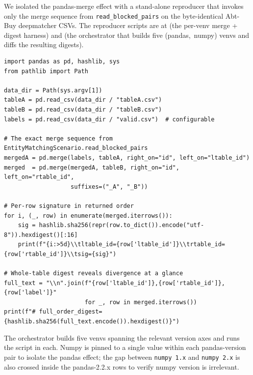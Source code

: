 \documentclass[11pt]{article}
\begin{document}
We isolated the pandas-merge effect with a stand-alone reproducer that
  invokes only the merge sequence from
  \texttt{read\_blocked\_pairs} on the byte-identical Abt-Buy
  deepmatcher CSVs.
The reproducer scripts are at
   (the per-venv merge +
  digest harness) and
   (the orchestrator that builds
  five \mbox{(pandas, numpy)} venvs and diffs the resulting digests).

\begin{lstlisting}[style=python, caption={The merge sequence under test
  (\texttt{em\_pandas\_mwe\_run.py}, excerpt).\label{lst:tr-em-mwe-run}}]
import pandas as pd, hashlib, sys
from pathlib import Path

data_dir = Path(sys.argv[1])
tableA = pd.read_csv(data_dir / "tableA.csv")
tableB = pd.read_csv(data_dir / "tableB.csv")
labels = pd.read_csv(data_dir / "valid.csv")  # configurable

# The exact merge sequence from EntityMatchingScenario.read_blocked_pairs
mergedA = pd.merge(labels, tableA, right_on="id", left_on="ltable_id")
merged  = pd.merge(mergedA, tableB, right_on="id", left_on="rtable_id",
                   suffixes=("_A", "_B"))

# Per-row signature in returned order
for i, (_, row) in enumerate(merged.iterrows()):
    sig = hashlib.sha256(repr(row.to_dict()).encode("utf-8")).hexdigest()[:16]
    print(f"{i:>5d}\\tltable_id={row['ltable_id']}\\trtable_id={row['rtable_id']}\\tsig={sig}")

# Whole-table digest reveals divergence at a glance
full_text = "\\n".join(f"{row['ltable_id']},{row['rtable_id']},{row['label']}"
                       for _, row in merged.iterrows())
print(f"# full_order_digest={hashlib.sha256(full_text.encode()).hexdigest()}")
\end{lstlisting}

The orchestrator builds five venvs spanning the relevant version
  axes and runs the script in each.
Numpy is pinned to a single value within each pandas-version pair to
  isolate the pandas effect; the gap between
  \texttt{numpy~1.x} and \texttt{numpy~2.x} is also crossed inside the
  pandas-2.2.x rows to verify numpy version is irrelevant.
\end{document}
